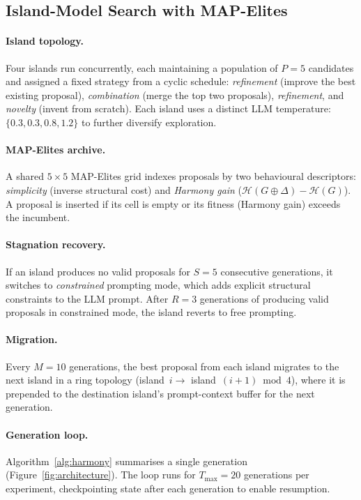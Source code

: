 \subsection{Island-Model Search with MAP-Elites}\label{sec:search}

\paragraph{Island topology.}
Four islands run concurrently, each maintaining a population of $P = 5$
candidates and assigned a fixed strategy from a cyclic schedule:
\emph{refinement} (improve the best existing proposal), \emph{combination}
(merge the top two proposals), \emph{refinement}, and \emph{novelty} (invent from
scratch).  Each island uses a distinct LLM temperature: $\{0.3, 0.3, 0.8,
1.2\}$ to further diversify exploration.

\paragraph{MAP-Elites archive.}
A shared $5 \times 5$ MAP-Elites grid \citep{mouret2015mapelites} indexes
proposals by two behavioural descriptors: \emph{simplicity} (inverse structural
cost) and \emph{Harmony gain} ($\mathcal{H}(G \oplus \Delta) -
\mathcal{H}(G)$).  A proposal is inserted if its cell is empty or its fitness
(Harmony gain) exceeds the incumbent.

\paragraph{Stagnation recovery.}
If an island produces no valid proposals for $S = 5$ consecutive generations,
it switches to \emph{constrained} prompting mode, which adds explicit
structural constraints to the LLM prompt.  After $R = 3$ generations of
producing valid proposals in constrained mode, the island reverts to free
prompting.

\paragraph{Migration.}
Every $M = 10$ generations, the best proposal from each island migrates to the
next island in a ring topology (island~$i \to$ island~$(i+1) \bmod 4$),
where it is prepended to the destination island's prompt-context buffer for the
next generation.

\paragraph{Generation loop.}
Algorithm~\ref{alg:harmony} summarises a single generation
(Figure~\ref{fig:architecture}).  The loop runs for $T_{\max} = 20$ generations
per experiment, checkpointing state after each generation to enable resumption.

